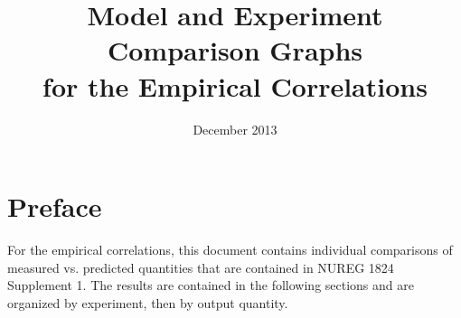\documentclass[12pt, titlepage]{article}
\begin{document}
\title{Model and Experiment Comparison Graphs\\ for the Empirical Correlations}
\date{December 2013}

\maketitle

\section*{Preface}

For the empirical correlations, this document contains individual comparisons of measured vs. predicted quantities that are contained in NUREG 1824 Supplement 1. The results are contained in the following sections and are organized by experiment, then by output quantity.

\cleardoublepage
{}
{}
\tableofcontents


\end{document}
